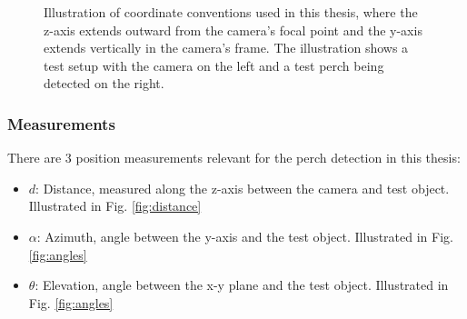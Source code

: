 \begin{figure}[H]
    \caption{Illustration of coordinate conventions used in this thesis, where the z-axis extends
    outward from the camera's focal point and the y-axis extends vertically in the camera's frame.
    The illustration shows a test setup with the camera on the left and a test perch being detected
    on the right.}
    \label{fig:coordinates}
\end{figure}

\subsubsection{Measurements} \label{sec:conv:meas}

There are 3 position measurements relevant for the perch detection in this thesis:

\begin{itemize}
    \item $d$: Distance, measured along the z-axis between the camera and test object. Illustrated in Fig. \ref{fig:distance}
    \item $\alpha$: Azimuth, angle between the y-axis and the test object. Illustrated in Fig. \ref{fig:angles}
    \item $\theta$: Elevation, angle between the x-y plane and the test object. Illustrated in Fig. \ref{fig:angles}
\end{itemize}

